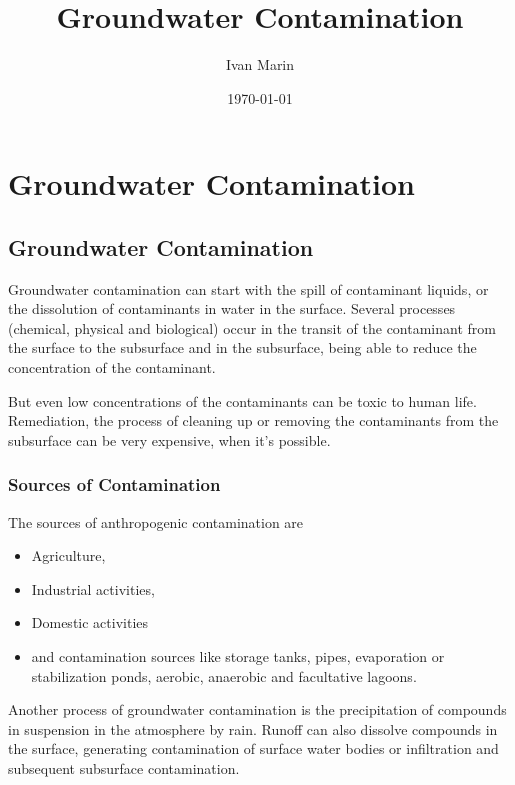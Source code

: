 \documentclass[11pt,twoside]{report}
\title{Groundwater Contamination}
\author{Ivan Marin}
\date{\today}
\begin{document}
\maketitle
\tableofcontents

\chapter{Groundwater Contamination}
\section{Groundwater Contamination}
Groundwater contamination can start with the spill of contaminant liquids, or the dissolution of contaminants in water in the surface. Several processes (chemical, physical and biological) occur in the transit of the contaminant from the surface to the subsurface and in the subsurface, being able to reduce the concentration of the contaminant. 

But even low concentrations of the contaminants can be toxic to human life. Remediation, the process of cleaning up or removing the contaminants from the subsurface can be very expensive, when it's possible. 

\subsection{Sources of Contamination}
The sources of anthropogenic contamination are 
\begin{itemize}
 \item Agriculture,
 \item Industrial activities,
 \item Domestic activities
 \item and contamination sources like storage tanks, pipes, evaporation or stabilization ponds, aerobic, anaerobic and facultative lagoons.
\end{itemize}

Another process of groundwater contamination is the precipitation of compounds in suspension in the atmosphere by rain. Runoff can also dissolve compounds in the surface, generating contamination of surface water bodies or infiltration and subsequent subsurface contamination. 
\end{document}
